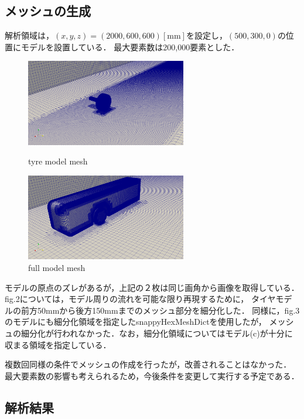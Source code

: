 \documentclass[twocolumn,a4j]{jsarticle}
\begin{document}
\subsection{メッシュの生成}
解析領域は，$(x, y, z) = (2000, 600, 600) \left[ \mathrm{mm} \right]$を設定し，$(500, 300, 0)$の位置にモデルを設置している．
最大要素数は200,000要素とした．
\begin{figure}[htbp]
    \begin{center}
        \includegraphics[width=70mm]{screenshots/tyremodel_mesh.png}
        \caption{tyre model mesh}
        \includegraphics[width=70mm]{screenshots/fullmodel_mesh.png}
        \caption{full model mesh}
    \end{center}
\end{figure}
モデルの原点のズレがあるが，上記の２枚は同じ画角から画像を取得している．
fig.2については，モデル周りの流れを可能な限り再現するために，
タイヤモデルの前方50mmから後方150mmまでのメッシュ部分を細分化した．
同様に，fig.3のモデルにも細分化領域を指定したsnappyHexMeshDictを使用したが，
メッシュの細分化が行われなかった．なお，細分化領域についてはモデル(c)が十分に収まる領域を指定している．
\par
複数回同様の条件でメッシュの作成を行ったが，改善されることはなかった．
最大要素数の影響も考えられるため，今後条件を変更して実行する予定である．

\newpage
\subsection{解析結果}
\end{document}
